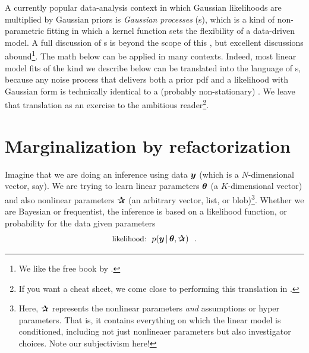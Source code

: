 A currently popular data-analysis context in which Gaussian likelihoods are
multiplied by Gaussian priors is \textsl{Gaussian processes} (s),
which is a kind of
non-parametric fitting in which a kernel function sets the flexibility of a
data-driven model. A full discussion of s is beyond the scope of this
\documentname, but excellent discussions abound\footnote{We like the free
  book by \cite{Rasmussen:2005}.}.
The math below can be applied in many  contexts.
Indeed, most linear model fits of the kind we describe below can be translated
into the language of s, because any noise process that delivers
both a prior pdf and a likelihood with Gaussian form is technically identical
to a (probably non-stationary) .
We leave that translation as an exercise to the ambitious
reader\footnote{If you want a cheat sheet,
  we come close to performing this translation in \cite{luger}.}.


\section{Marginalization by refactorization}

Imagine that we are doing an inference using data $\boldsymbol{y}$ (which is a
$N$-dimensional vector, say).
We are trying to learn linear parameters $\boldsymbol{\theta}$ (a $K$-dimensional vector)
and also nonlinear parameters $\bP$ (an arbitrary vector, list, or
blob)\footnote{Here, $\bP$ represents the nonlinear parameters \emph{and}
  assumptions or hyper parameters. That is, it contains everything on which
  the linear model is conditioned, including not just nonlineaer parameters
  but also investigator choices. Note our subjectivism here!}.
Whether we are Bayesian or frequentist, the inference is based on
a likelihood function, or probability for the data given parameters
\begin{equation}
\mbox{\small likelihood:} \hquad p(\vy\given\vtheta,\bP) \hquad.
\end{equation}

